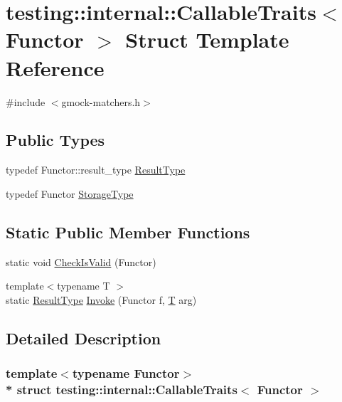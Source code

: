 \hypertarget{structtesting_1_1internal_1_1_callable_traits}{}\section{testing\+:\+:internal\+:\+:Callable\+Traits$<$ Functor $>$ Struct Template Reference}
\label{structtesting_1_1internal_1_1_callable_traits}


{\ttfamily \#include $<$gmock-\/matchers.\+h$>$}

\subsection*{Public Types}
\begin{DoxyCompactItemize}
\item 
typedef Functor\+::result\+\_\+type \hyperlink{structtesting_1_1internal_1_1_callable_traits_a242d198dd1c56a153ba931d7166ec7f3}{Result\+Type}
\item 
typedef Functor \hyperlink{structtesting_1_1internal_1_1_callable_traits_a23cc0c86a3bd18b2f8dd159dd44e1168}{Storage\+Type}
\end{DoxyCompactItemize}
\subsection*{Static Public Member Functions}
\begin{DoxyCompactItemize}
\item 
static void \hyperlink{structtesting_1_1internal_1_1_callable_traits_ab09a6487235947ec9c5d933d07ac605b}{Check\+Is\+Valid} (Functor)
\item 
{\footnotesize template$<$typename T $>$ }\\static \hyperlink{structtesting_1_1internal_1_1_callable_traits_a242d198dd1c56a153ba931d7166ec7f3}{Result\+Type} \hyperlink{structtesting_1_1internal_1_1_callable_traits_ad54471cad61aefbe15de330867ff5936}{Invoke} (Functor f, \hyperlink{functions__7_8js_adf1f3edb9115acb0a1e04209b7a9937b}{T} arg)
\end{DoxyCompactItemize}


\subsection{Detailed Description}
\subsubsection*{template$<$typename Functor$>$\\*
struct testing\+::internal\+::\+Callable\+Traits$<$ Functor $>$}



